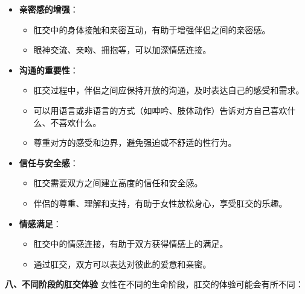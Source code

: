 \documentclass[12pt,UTF8]{ctexbook}
\begin{document}
\begin{itemize}
	\item \textbf{亲密感的增强}：
	\begin{itemize}
		\item 肛交中的身体接触和亲密互动，有助于增强伴侣之间的亲密感。
		\item 眼神交流、亲吻、拥抱等，可以加深情感连接。
	\end{itemize}
	\item \textbf{沟通的重要性}：
	\begin{itemize}
		\item 肛交过程中，伴侣之间应保持开放的沟通，及时表达自己的感受和需求。
		\item 可以用语言或非语言的方式（如呻吟、肢体动作）告诉对方自己喜欢什么、不喜欢什么。
		\item 尊重对方的感受和边界，避免强迫或不舒适的性行为。
	\end{itemize}
	\item \textbf{信任与安全感}：
	\begin{itemize}
		\item 肛交需要双方之间建立高度的信任和安全感。
		\item 伴侣的尊重、理解和支持，有助于女性放松身心，享受肛交的乐趣。
	\end{itemize}
	\item \textbf{情感满足}：
	\begin{itemize}
		\item 肛交中的情感连接，有助于双方获得情感上的满足。
		\item 通过肛交，双方可以表达对彼此的爱意和亲密。
	\end{itemize}
\end{itemize}

\textbf{八、不同阶段的肛交体验}
女性在不同的生命阶段，肛交的体验可能会有所不同：
\end{document}
